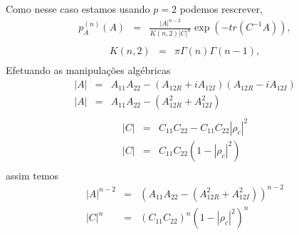 \documentclass[12pt,a4paper]{article}
\begin{document}
Como nesse caso estamos usando $p=2$ podemos rescrever,
\begin{equation}\label{sec1eqn34}
\begin{array}{ccc}
	p_A^{(n)}(A)&=&\frac{|A|^{n-2}}{K(n,2)|C|^n} \exp(-tr(C^{-1}A)), \\
\end{array}
\end{equation}
\begin{equation}\label{sec1eqn35}
\begin{array}{ccc}
	K(n,2)&=&\pi\Gamma(n)\Gamma(n-1), \\
\end{array}
\end{equation}
Efetuando as manipulações algébricas
\begin{equation}\label{sec1eqn36}
\begin{array}{ccc}
	\left|A\right|&=&A_{11}A_{22}-(A_{12R}+iA_{12I})(A_{12R}-iA_{12I})\\
	\left|A\right|&=&A_{11}A_{22}-(A_{12R}^2+A_{12I}^2)\\
\end{array}
\end{equation}
\begin{equation}\label{sec1eqn37}
\begin{array}{ccc}
	\left|C\right|&=&C_{11}C_{22}-C_{11}C_{22}\left|\rho_c\right|^2\\
	\left|C\right|&=&C_{11}C_{22}(1-\left|\rho_c\right|^2)\\
\end{array}
\end{equation}
assim temos
\begin{equation}\label{sec1eqn38}
\begin{array}{ccc}
	\left|A\right|^{n-2}&=&(A_{11}A_{22}-(A_{12R}^2+A_{12I}^2))^{n-2}\\
	\left|C\right|^{n}&=&(C_{11}C_{22})^{n}(1-\left|\rho_c\right|^2)^{n}\\
\end{array}
\end{equation}
\end{document}

